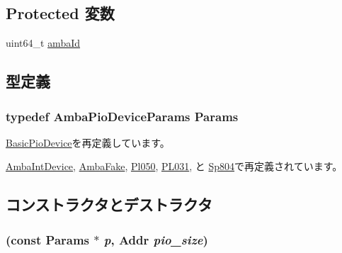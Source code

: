 \subsection*{Protected 変数}
\begin{DoxyCompactItemize}
\item 
uint64\_\-t \hyperlink{classAmbaPioDevice_a3201bf99dce0ba0bb6a5fd367f3dd76e}{ambaId}
\end{DoxyCompactItemize}


\subsection{型定義}
\hypertarget{classAmbaPioDevice_ab091a3a8ffa1f3152ec35e30d1b384d5}{
\subsubsection[{Params}]{\setlength{\rightskip}{0pt plus 5cm}typedef AmbaPioDeviceParams {\bf Params}}}
\label{classAmbaPioDevice_ab091a3a8ffa1f3152ec35e30d1b384d5}


\hyperlink{classBasicPioDevice_a2845515ac6467f10540747053c8a0449}{BasicPioDevice}を再定義しています。

\hyperlink{classAmbaIntDevice_aa70660260d212b343768d91a298c80de}{AmbaIntDevice}, \hyperlink{classAmbaFake_af81895617462b041d86cd650bb1e27d3}{AmbaFake}, \hyperlink{classPl050_a12cd0d18c639c998ce04efabfca4d619}{Pl050}, \hyperlink{classPL031_acd44fa02a8cc03d321b406d70faea0d8}{PL031}, と \hyperlink{classSp804_af822827c8c9baefc6aafbdc713bc2b8d}{Sp804}で再定義されています。

\subsection{コンストラクタとデストラクタ}
\hypertarget{classAmbaPioDevice_a4d233593026e483123ea04aaa7fe8daf}{
\subsubsection[{AmbaPioDevice}]{ (const {\bf Params} $\ast$ {\em p}, \/  {\bf Addr} {\em pio\_\-size})}}
\label{classAmbaPioDevice_a4d233593026e483123ea04aaa7fe8daf}



